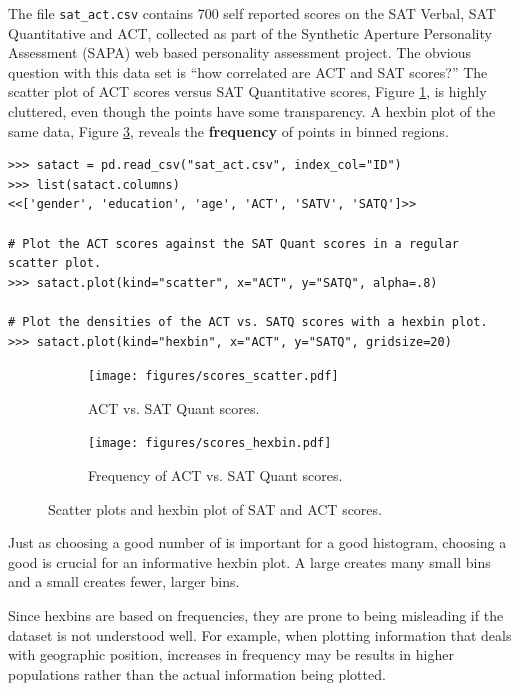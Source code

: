 The file \texttt{sat\_act.csv} contains 700 self reported scores on the SAT Verbal, SAT Quantitative and ACT, collected as part of the Synthetic Aperture Personality Assessment (SAPA) web based personality assessment project.
The obvious question with this data set is ``how correlated are ACT and SAT scores?''
The scatter plot of ACT scores versus SAT Quantitative scores, Figure \ref{fig:pandas-act-scatter}, is highly cluttered, even though the points have some transparency.
A hexbin plot of the same data, Figure \ref{fig:pandas-act-hexbin}, reveals the \textbf{frequency} of points in binned regions.

\newpage

\begin{lstlisting}
>>> satact = pd.read_csv("sat_act.csv", index_col="ID")
>>> list(satact.columns)
<<['gender', 'education', 'age', 'ACT', 'SATV', 'SATQ']>>

# Plot the ACT scores against the SAT Quant scores in a regular scatter plot.
>>> satact.plot(kind="scatter", x="ACT", y="SATQ", alpha=.8)

# Plot the densities of the ACT vs. SATQ scores with a hexbin plot.
>>> satact.plot(kind="hexbin", x="ACT", y="SATQ", gridsize=20)
\end{lstlisting}

\begin{figure}[H]
\captionsetup[subfigure]{justification=centering}
\centering
\begin{subfigure}{.49\textwidth}
    \texttt{[image: figures/scores\_scatter.pdf]}
    \caption{ACT vs. SAT Quant scores.}
    \label{fig:pandas-act-scatter}
\end{subfigure}
%
\begin{subfigure}{.49\textwidth}
    \texttt{[image: figures/scores\_hexbin.pdf]}
    \caption{Frequency of ACT vs. SAT Quant scores.}
    \label{fig:pandas-act-hexbin}
\end{subfigure}
\caption{Scatter plots and hexbin plot of SAT and ACT scores.}
\end{figure}

Just as choosing a good number of  is important for a good histogram, choosing a good  is crucial for an informative hexbin plot.
A large  creates many small bins and a small  creates fewer, larger bins.

\begin{info}
Since hexbins are based on frequencies, they are prone to being misleading if the dataset is not understood well. For example, when plotting information that deals with geographic position, increases in frequency may be results in higher populations rather than the actual information being plotted.

\end{info}

